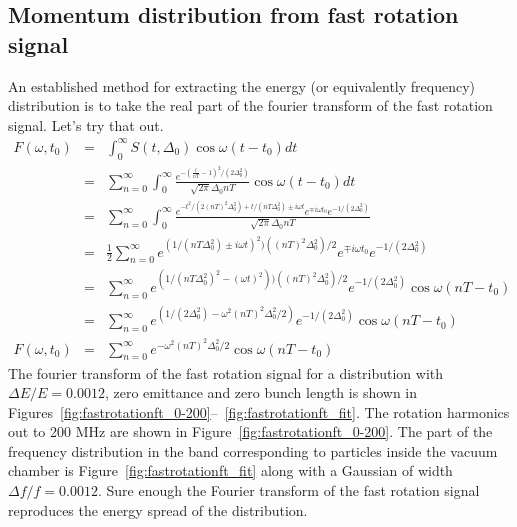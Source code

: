 \documentclass[10pt]{article}
\begin{document}
\subsection{Momentum distribution from fast rotation signal}
An established method for extracting the energy (or equivalently frequency) distribution is to take the real part of the fourier transform of the fast rotation signal\cite{orlov}.
Let's try that out.
\begin{eqnarray}
F(\omega,t_0) &=&\int_0^\infty S(t,\Delta_0)\cos\omega(t-t_0) dt\nonumber\\
&=& \sum_{n=0}^\infty \int_0^\infty
\frac{e^{-(\frac{t}{nT}-1)^2/(2\Delta_0^2)}}{\sqrt{2\pi}\Delta_0 nT}\cos\omega(t-t_0) dt\nonumber\\
&=& \sum_{n=0}^\infty \int_0^\infty
\frac{e^{-t^2/(2(nT)^2\Delta_0^2)+t/(nT\Delta_0^2)\pm i\omega t}e^{\mp i\omega t_0}e^{-1/(2\Delta_0^2)}}{\sqrt{2\pi}\Delta_0 nT}\nonumber\\
&=& \frac{1}{2}\sum_{n=0}^\infty 
e^{(1/(nT\Delta_0^2)\pm i\omega t)^2)((nT)^2\Delta_0^2)/2}e^{\mp i\omega t_0}e^{-1/(2\Delta_0^2)}\nonumber\\
&=&\sum_{n=0}^\infty 
e^{(1/(nT\Delta_0^2)^2-(\omega t)^2))((nT)^2\Delta_0^2)/2}e^{-1/(2\Delta_0^2)}\cos\omega(nT-t_0)\nonumber\\
&=&\sum_{n=0}^\infty 
e^{(1/(2\Delta_0^2)-\omega ^2(nT)^2\Delta_0^2/2)}e^{-1/(2\Delta_0^2)}\cos\omega(nT-t_0)\nonumber\\
F(\omega,t_0)&=&\sum_{n=0}^\infty e^{-\omega^2(nT)^2\Delta_0^2/2}\cos\omega(nT-t_0)\label{eq:ftoffr}
\end{eqnarray}
The fourier transform of the fast rotation signal for a distribution with $\Delta E/E=0.0012$, zero emittance and zero bunch length is shown 
in Figures~\ref{fig:fastrotationft_0-200}--~\ref{fig:fastrotationft_fit}. The rotation harmonics out to 200 MHz are shown in Figure~\ref{fig:fastrotationft_0-200}. The
part of the frequency distribution in the band corresponding to particles inside the vacuum chamber is Figure~\ref{fig:fastrotationft_fit} along with a Gaussian of
width $\Delta f/f = 0.0012$. Sure enough the Fourier transform of the fast rotation signal reproduces the energy spread of the distribution.
\end{document}

